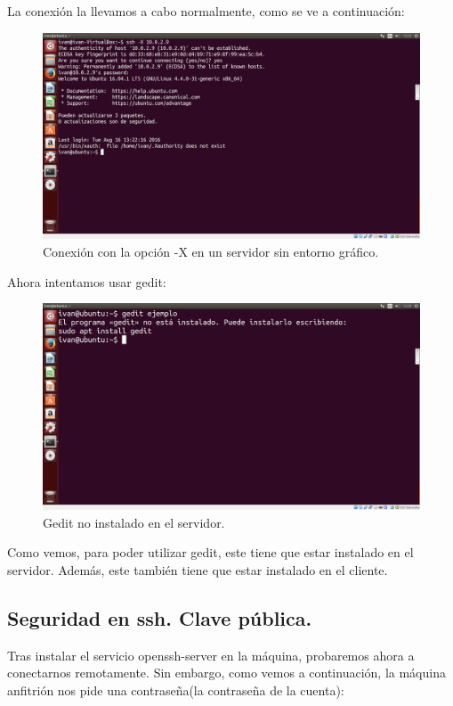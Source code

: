 \begin{itemize}
	La conexión la llevamos a cabo normalmente, como se ve a continuación:\\
	
	\begin{figure}[H]
	\centering
	\includegraphics[width=0.7\linewidth]{Conexion-no-grafica}
	\caption[Conexión no gráfica]{Conexión con la opción -X en un servidor sin entorno gráfico.}
	\label{fig:Conexion-no-grafica}
	\end{figure}
	
	Ahora intentamos usar gedit:\\
	
	\begin{figure}[H]
	\centering
	\includegraphics[width=0.7\linewidth]{gedit_fail}
	\caption[Fallo gedit]{Gedit no instalado en el servidor.}
	\label{fig:gedit_fail}
	\end{figure}
	
	Como vemos, para poder utilizar gedit, este tiene que estar instalado en el servidor. Además, este también tiene que estar instalado en el cliente.
 	
 \end{itemize}
 
 \subsection{Seguridad en ssh. Clave pública.}
 
 Tras instalar el servicio openssh-server en la máquina, probaremos ahora a conectarnos remotamente. Sin embargo, como vemos a continuación, la máquina anfitrión nos pide una contraseña(la contraseña de la cuenta):\\
 
